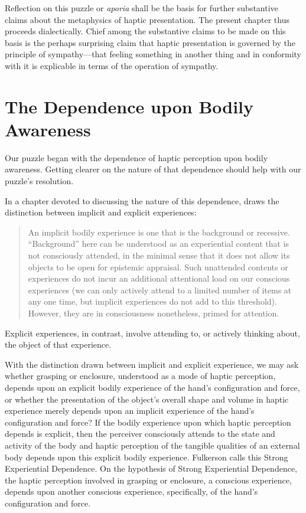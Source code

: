 Reflection on this puzzle or \emph{aporia} shall be the basis for further substantive claims about the metaphysics of haptic presentation. The present chapter thus proceeds dialectically. Chief among the substantive claims to be made on this basis is the perhaps surprising claim that haptic presentation is governed by the principle of sympathy---that feeling something in another thing and in conformity with it is explicable in terms of the operation of sympathy. 


\section{The Dependence upon Bodily Awareness} %
\label{sec:the_dependence_of_haptic_perception_upon_bodily_awareness}

Our puzzle began with the dependence of haptic perception upon bodily awareness. Getting clearer on the nature of that dependence should help with our puzzle's resolution. 

In a chapter devoted to discussing the nature of this dependence, \citet[chapter 4.6]{Fulkerson:2014ek} draws the distinction between implicit and explicit experiences:
\begin{quote}
	An implicit bodily experience is one that is the background or recessive. ``Background'' here can be understood as an experiential content that is not consciously attended, in the minimal sense that it does not allow its objects to be open for epistemic appraisal. Such unattended contents or experiences do not incur an additional attentional load on our conscious experiences (we can only actively attend to a limited number of items at any one time, but implicit experiences do not add to this threshold). However, they are in consciousness nonetheless, primed for attention. \citep[90]{Fulkerson:2014ek}
\end{quote}
Explicit experiences, in contrast, involve attending to, or actively thinking about, the object of that experience. 

With the distinction drawn between implicit and explicit experience, we may ask whether grasping or enclosure, understood as a mode of haptic perception, depends upon an explicit bodily experience of the hand's configuration and force, or whether the presentation of the object's overall shape and volume in haptic experience merely depends upon an implicit experience of the hand's configuration and force? If the bodily experience upon which haptic perception depends is explicit, then the perceiver consciously attends to the state and activity of the body and haptic perception of the tangible qualities of an external body depends upon this explicit bodily experience. Fulkerson calls this Strong Experiential Dependence. On the hypothesis of Strong Experiential Dependence, the haptic perception involved in grasping or enclosure, a conscious experience, depends upon another conscious experience, specifically, of the hand's configuration and force.

